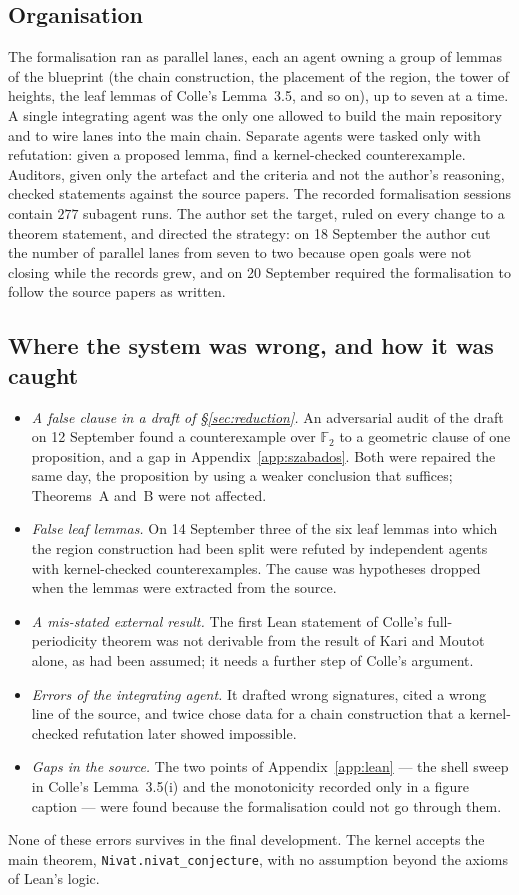 \documentclass[11pt,reqno]{amsart}
\theoremstyle{plain}
\theoremstyle{definition}
\theoremstyle{remark}
\theoremstyle{plain}
\theoremstyle{remark}
\theoremstyle{definition}
\numberwithin{equation}{section}
\begin{document}
\subsection*{Organisation}
The formalisation ran as parallel lanes, each an agent owning a group of
lemmas of the blueprint (the chain construction, the placement of the region,
the tower of heights, the leaf lemmas of Colle's Lemma~3.5, and so on), up to
seven at a time.  A single integrating agent was the only one allowed to build
the main repository and to wire lanes into the main chain.  Separate agents
were tasked only with refutation: given a proposed lemma, find a
kernel-checked counterexample.  Auditors, given only the artefact and the
criteria and not the author's reasoning, checked statements against the source
papers.  The recorded formalisation sessions contain $277$ subagent runs.
The author set the target, ruled on every change to a theorem statement, and
directed the strategy: on 18 September the author cut the number of parallel
lanes from seven to two because open goals were not closing while the records
grew, and on 20 September required the formalisation to follow the source
papers as written.

\subsection*{Where the system was wrong, and how it was caught}
\begin{itemize}
\item \emph{A false clause in a draft of \S\ref{sec:reduction}.}  An
  adversarial audit of the draft on 12 September found a counterexample over
  $\mathbb F_2$ to a geometric clause of one proposition, and a gap in
  Appendix~\ref{app:szabados}.  Both were repaired the same day, the
  proposition by using a weaker conclusion that suffices; Theorems~A and~B
  were not affected.
\item \emph{False leaf lemmas.}  On 14 September three of the six leaf lemmas
  into which the region construction had been split were refuted by
  independent agents with kernel-checked counterexamples.  The cause was
  hypotheses dropped when the lemmas were extracted from the source.
\item \emph{A mis-stated external result.}  The first Lean statement of Colle's
  full-periodicity theorem was not derivable from the result of Kari and Moutot
  alone, as had been assumed; it needs a further step of Colle's argument.
\item \emph{Errors of the integrating agent.}  It drafted wrong signatures,
  cited a wrong line of the source, and twice chose data for a chain
  construction that a kernel-checked refutation later showed impossible.
\item \emph{Gaps in the source.}  The two points of Appendix~\ref{app:lean}
  — the shell sweep in Colle's Lemma~3.5(i) and the monotonicity recorded only
  in a figure caption — were found because the formalisation could not go
  through them.
\end{itemize}
None of these errors survives in the final development.  The kernel accepts
the main theorem, \texttt{Nivat.nivat\_conjecture}, with no assumption beyond
the axioms of Lean's logic.
\end{document}
